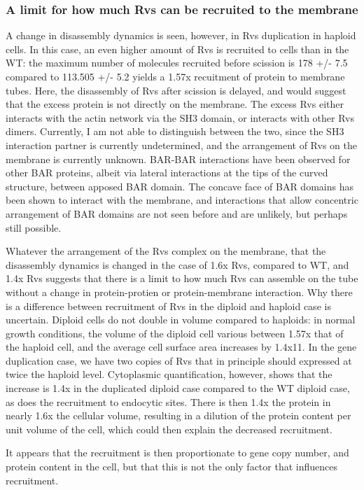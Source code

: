 \subsubsection{A limit for how much Rvs can be recruited to the membrane}
A change in disassembly dynamics is seen, however, in Rvs duplication in haploid cells. In this case, an even higher amount of Rvs is recruited to cells than in the WT: the maximum number of molecules recruited before scission is 178 +/- 7.5 compared to 113.505 +/- 5.2 yields a 1.57x recuitment of protein to membrane tubes. Here, the disassembly of Rvs after scission is delayed, and would suggest that the excess protein is not directly on the membrane. The excess Rvs either interacts with the actin network via the SH3 domain, or interacts with other Rvs dimers. Currently, I am not able to distinguish between the two, since the SH3 interaction partner is currently undetermined, and the arrangement of Rvs on the membrane is currently unknown. BAR-BAR interactions have been observed for other BAR proteins, albeit via lateral interactions at the tips of the curved structure, between apposed BAR domain. The concave face of BAR domains has been shown to interact with the membrane, and interactions that allow concentric arrangement of BAR domains are not seen before and are unlikely, but perhaps still possible.

Whatever the arrangement of the Rvs complex on the membrane, that the disassembly dynamics is changed in the case of 1.6x Rvs, compared to WT, and 1.4x Rvs suggests that there is a limit to how much Rvs can assemble on the tube without a change in protein-protien or protein-membrane interaction. Why there is a difference between recruitment of Rvs in the diploid and haploid case is uncertain. Diploid cells do not double in volume compared to haploids: in normal growth conditions, the volume of the diploid cell various between 1.57x that of the haploid cell, and the average cell surface area increases by 1.4x11. In the gene duplication case, we have two copies of Rvs that in principle should expressed at twice the haploid level. Cytoplasmic quantification, however, shows that the increase is 1.4x in the duplicated diploid case compared to the WT diploid case, as does the recruitment to endocytic sites. There is then 1.4x the protein in nearly 1.6x the cellular volume, resulting in a dilution of the protein content per unit volume of the cell, which could then explain the decreased recruitment. 

It appears that the recruitment is then proportionate to gene copy number, and protein content in the cell, but that this is not the only factor that influences recruitment. 


